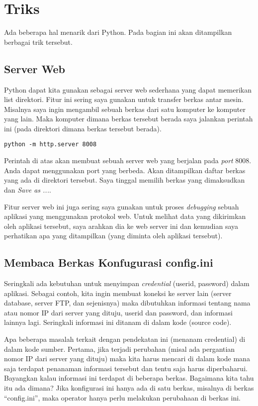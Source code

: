 \chapter{Triks}
Ada beberapa hal menarik dari Python. Pada bagian ini akan ditampilkan berbagai
trik tersebut.

\section{Server Web}
Python dapat kita gunakan sebagai server web sederhana yang dapat memerikan
list direktori. Fitur ini sering saya gunakan untuk transfer berkas antar
mesin. Misalnya saya ingin mengambil sebuah berkas dari satu komputer ke
komputer yang lain. Maka komputer dimana berkas tersebut berada saya jalankan
perintah ini (pada direktori dimana berkas tersebut berada).

\begin{verbatim}
python -m http.server 8008
\end{verbatim}

Perintah di atas akan membuat sebuah server web yang berjalan pada {\em port}
8008. Anda dapat menggunakan port yang berbeda.
Akan ditampilkan daftar berkas yang ada di direktori tersebut. Saya tinggal
memilih berkas yang dimaksudkan dan {\em Save as ...}.

Fitur server web ini juga sering saya gunakan untuk proses {\em debugging}
sebuah aplikasi yang menggunakan protokol web. Untuk melihat data yang
dikirimkan oleh aplikasi tersebut, saya arahkan dia ke web server ini dan
kemudian saya perhatikan apa yang ditampilkan (yang diminta oleh aplikasi
tersebut).

\section{Membaca Berkas Konfugurasi config.ini}
Seringkali ada kebutuhan untuk menyimpan {\em credential} (userid, password)
dalam aplikasi. Sebagai contoh, kita ingin membuat koneksi ke server lain
(server database, server FTP, dan sejenisnya) maka dibutuhkan informasi
tentang nama atau nomor IP dari server yang dituju, userid dan password,
dan informasi lainnya lagi.
Seringkali informasi ini ditanam di dalam kode (source code).

Apa beberapa masalah terkait dengan pendekatan ini (menanam credential)
di dalam kode sumber.
Pertama, jika terjadi perubahan (misal ada pergantian nomor IP dari server
yang dituju) maka kita harus mencari di dalam kode mana saja terdapat
penanaman informasi tersebut dan tentu saja harus diperbaharui.
Bayangkan kalau informasi ini terdapat di beberapa berkas. 
Bagaimana kita tahu itu ada dimana?
Jika konfigurasi ini hanya ada di satu berkas, misalnya di berkas
``config.ini'', maka operator hanya perlu melakukan perubahaan di berkas ini.


